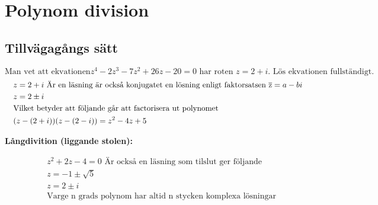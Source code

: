 \newpage

\section{Polynom division}
\subsection{Tillvägagångs sätt}
\begin{equation}
   \text{Man vet att ekvationen} z^4 - 2z^3 - 7z^2 + 26z - 20 = 0 \text{ har roten } z = 2 + i \text{. Lös ekvationen fullständigt.}
\end{equation}
\begin{align*}
  &\quad z = 2 + i \text{ Är en läsning är också konjugatet en lösning enligt faktorsatsen } \overline{\rm z}= a - b i \\
  &\quad z = 2 \pm i \\
  &\quad \text{Vilket betyder att följande går att factorisera ut polynomet} \\
  &\quad (z -(2 + i))(z -(2 - i)) = z^2 - 4z + 5 \\
\end{align*}

\textbf{Långdivition (liggande stolen):}\par
{}%

\begin{align*}
  &\quad z^2 + 2z - 4 = 0 \text{ Är också en läsning som tilslut ger följande} \\
  &\quad z = -1 \pm \sqrt{5} \\
  &\quad z = 2 \pm i \\
  &\quad \text{Varge n grads polynom har altid n stycken komplexa lösningar} \\
\end{align*}


\newpage

